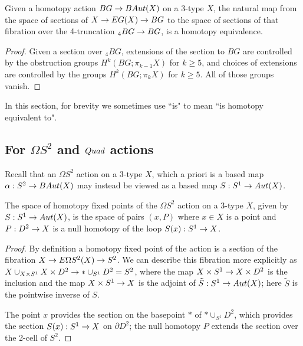 \documentclass{amsart}
\begin{document}
\begin{proposition} \label{prop-hofptrunc}
Given a homotopy action $BG \rightarrow BAut(X)$ on a 3-type $X$, the natural map from the space of sections of $X \rightarrow EG(X) \rightarrow BG$ to the space of sections of that fibration over the 4-truncation ${}_4 BG \rightarrow BG$, is a homotopy equivalence.
\end{proposition}
\begin{proof}
Given a section over ${}_4 BG$, extensions of the section to $BG$ are controlled by the obstruction groups $H^k(BG;\pi_{k-1} X)$ for $k \geq 5$, and choices of extensions are controlled by the groups $H^k(BG;\pi_k X)$ for $k \geq 5$.  All of those groups vanish.
\end{proof}

In this section, for brevity we sometimes use ``is" to mean ``is homotopy equivalent to".

\subsection{For $\Omega S^2$ and $Quad$ actions}

Recall that an $\Omega S^2$ action on a 3-type $X$, which a priori is a based map $\alpha: S^2 \rightarrow BAut(X)$ may instead be viewed as a based map $S: S^1 \rightarrow Aut(X)$.

\begin{proposition}
The space of homotopy fixed points of the $\Omega S^2$ action on a 3-type $X$, given by $S: S^1 \rightarrow Aut(X)$, is the space of pairs $(x,P)$ where $x \in X$ is a point and $P: D^2 \rightarrow X$ is a null homotopy of the loop $S(x): S^1 \rightarrow X$.
\end{proposition}
\begin{proof}
By definition a homotopy fixed point of the action is a section of the fibration $X \rightarrow E\Omega S^2(X) \rightarrow S^2$.  We can describe this fibration more explicitly as $X \cup_{X \times S^1} X \times D^2 \rightarrow \ast \cup_{S^1} D^2 = S^2$, where the map $X \times S^1 \rightarrow X \times D^2$ is the inclusion and the map $X \times S^1 \rightarrow X$ is the adjoint of $\tilde{S}: S^1 \rightarrow Aut(X)$; here $\tilde{S}$ is the pointwise inverse of $S$.  %

The point $x$ provides the section on the basepoint $\ast$ of $\ast \cup_{S^1} D^2$, which provides the section $S(x): S^1 \rightarrow X$ on $\partial D^2$; the null homotopy $P$ extends the section over the 2-cell of $S^2$.
\end{proof}
\end{document}
